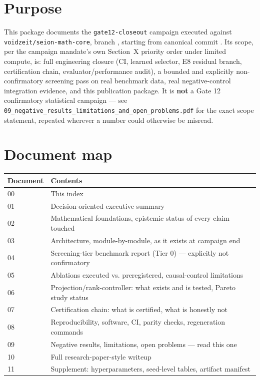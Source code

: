 \documentclass[11pt]{article}
\begin{document}

\tableofcontents

\section{Purpose}
This package documents the \texttt{gate12-closeout} campaign executed against
\texttt{voidzeit/seion-math-core}, branch \texttt{\CampaignBranch}, starting from canonical commit
\texttt{\CanonicalSHA}. Its scope, per the campaign mandate's own Section~X priority order under
limited compute, is: full engineering closure (CI, learned selector, E8 residual branch,
certification chain, evaluator/performance audit), a bounded and explicitly non-confirmatory
screening pass on real benchmark data, real negative-control integration evidence, and this
publication package. It is \textbf{not} a Gate 12 confirmatory statistical campaign --- see
\texttt{09\_negative\_results\_limitations\_and\_open\_problems.pdf} for the exact scope statement,
repeated wherever a number could otherwise be misread.

\section{Document map}
\begin{center}
\begin{tabular}{ll}
\toprule
Document & Contents \\
\midrule
00 & This index \\
01 & Decision-oriented executive summary \\
02 & Mathematical foundations, epistemic status of every claim touched \\
03 & Architecture, module-by-module, as it exists at campaign end \\
04 & Screening-tier benchmark report (Tier 0) --- explicitly not confirmatory \\
05 & Ablations executed vs. preregistered, causal-control limitations \\
06 & Projection/rank-controller: what exists and is tested, Pareto study status \\
07 & Certification chain: what is certified, what is honestly not \\
08 & Reproducibility, software, CI, parity checks, regeneration commands \\
09 & Negative results, limitations, open problems --- read this one \\
10 & Full research-paper-style writeup \\
11 & Supplement: hyperparameters, seed-level tables, artifact manifest \\
\bottomrule
\end{tabular}
\end{center}
\end{document}

